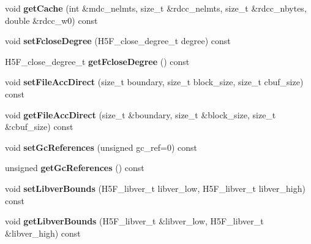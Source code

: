 \begin{DoxyCompactItemize}
void {\bfseries get\+Cache} (int \&mdc\+\_\+nelmts, size\+\_\+t \&rdcc\+\_\+nelmts, size\+\_\+t \&rdcc\+\_\+nbytes, double \&rdcc\+\_\+w0) const
\item 
\mbox{\label{class_h5_1_1_file_acc_prop_list_a102a014bec72d14f9eb04b48002f8d6c}} 
void {\bfseries set\+Fclose\+Degree} (H5\+F\+\_\+close\+\_\+degree\+\_\+t degree) const
\item 
\mbox{\label{class_h5_1_1_file_acc_prop_list_a83cbbf1b3f3ae42f6a369a4daddda301}} 
H5\+F\+\_\+close\+\_\+degree\+\_\+t {\bfseries get\+Fclose\+Degree} () const
\item 
\mbox{\label{class_h5_1_1_file_acc_prop_list_a652227ca2eab3fe774621981490a4cc3}} 
void {\bfseries set\+File\+Acc\+Direct} (size\+\_\+t boundary, size\+\_\+t block\+\_\+size, size\+\_\+t cbuf\+\_\+size) const
\item 
\mbox{\label{class_h5_1_1_file_acc_prop_list_afec088f2b00fec4bce5a4ba2ae555632}} 
void {\bfseries get\+File\+Acc\+Direct} (size\+\_\+t \&boundary, size\+\_\+t \&block\+\_\+size, size\+\_\+t \&cbuf\+\_\+size) const
\item 
\mbox{\label{class_h5_1_1_file_acc_prop_list_a9681a7f2855b73ccd63932ce57a74412}} 
void {\bfseries set\+Gc\+References} (unsigned gc\+\_\+ref=0) const
\item 
\mbox{\label{class_h5_1_1_file_acc_prop_list_aaa895a57e480e4fff951a5cea7b6f847}} 
unsigned {\bfseries get\+Gc\+References} () const
\item 
\mbox{\label{class_h5_1_1_file_acc_prop_list_a881f2d2a418e2ce3593c253a12a7e4c9}} 
void {\bfseries set\+Libver\+Bounds} (H5\+F\+\_\+libver\+\_\+t libver\+\_\+low, H5\+F\+\_\+libver\+\_\+t libver\+\_\+high) const
\item 
\mbox{\label{class_h5_1_1_file_acc_prop_list_a3fd4c6a9d5e6cff8263315aabb558d26}} 
void {\bfseries get\+Libver\+Bounds} (H5\+F\+\_\+libver\+\_\+t \&libver\+\_\+low, H5\+F\+\_\+libver\+\_\+t \&libver\+\_\+high) const

\end{DoxyCompactItemize}
